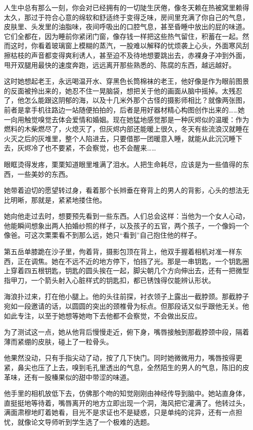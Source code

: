 \documentclass[lang=cn,newtx,12pt,scheme=chinese]{elegantbook}
\begin{document}
人生中总有那么一刻，你会对已经拥有的一切陡生厌倦，像冬天赖在热被窝里赖得太久，那过于符合心意的绵软和舒适终于变得乏味，房间里充满了你自己的气息，皮肤里、头发里的油脂味，夜间呼吸出的口腔气息，甚至昏睡中放出的屁的味道。它们全都在，因为睡前你紧闭门窗，像存钱一样把这些热气留住，积蓄在一起。然而这时，你看着玻璃窗上模糊的蒸汽，一股难以解释的忧烦袭上心头，外面寒风刮擦枯枝的声音都变得爽利诱人，甚至迫不及待地想要跳出去，赤裸身子冲到外面，甩开双腿用最快的速度奔跑，远远离开那些熟悉的、陈腐的东西，越远越好。

这时她想起老王，永远喝温开水、穿黑色长筒棉袜的老王，他好像是作为眼前图景的反面被拎出来的，她忍不住一晃脑袋，想把关于他的画面从脑中摇掉。太残忍了，他怎么能跟这阴郁的海，以及十几米外那个古怪的摄影师相比？就像两张图，前者是拿手机往路边一站随便拍拍的，后者是用好器材精心构图创作出来的……她一向用触觉嗅觉去体会爱情和婚姻。现在她猛地感觉那是一种灰烬似的温暖：作为燃料的木柴燃尽了，火熄灭了，但灰烬内部还能暖上很久，冬天有些流浪汉就睡在火灭之后的灰堆里，整个人陷进去，只要借那一团暖意入睡，就能从此沉沉睡下去，灰烬冷了也不要紧，不会察觉，也不会醒来……

眼眶烫得发疼，栗栗知道眼里堆满了泪水。人把生命耗尽，应该是为一些值得的东西，一些美妙的东西。

她带着迫切的愿望转过身，看着那个长辫垂在脊背上的男人的背影，心头的想法无比明晰，那就是，紧紧地搂住他。

她向他走过去时，想要预先看到一些东西。人们总会这样：当他为一个女人心动，他能瞬间想象出两人拍婚纱照的样子，以及孩子的五官，两个孩子，一个像妈一个像爸。可这次栗栗看不到那么远，她只“看到”自己抱住他的样子。

第五岳单膝跪在沙子里，佝着背，摄影包顶在背上，他双手握着相机对准一样东西，正在调焦。她在不远不近的地方停下，怕挡了光。那是一串钥匙，一个钥匙圈上穿着四五根钥匙，钥匙的圆头挨在一起，脚尖朝几个方向伸出去，还有一把微型指甲刀，一个箭头射入心脏样式的钥匙扣，都已锈蚀得仅能辨认形状。

海浪扑过来，打在他小腿上。他的头往前探，衬衣领子上露出一截脖颈。那截脖子宛如一段邀请的话，以圆圆的突出的颈椎骨为标点。但那段话又似乎跟他无关。他如此专注，以至于她想等她吻下去他都不会察觉，不会做出反应。

为了测试这一点，她从他背后慢慢走近，俯下身，嘴唇接触到那截脖颈中段，隔着薄而紧绷的皮肤，碰上了一粒骨头。

他果然没动，只有手指尖动了动，按了几下快门。同时她微微用力，嘴唇按得更紧，鼻尖也压了上去，嗅到毛孔里透出的气息，全然陌生的男人的气息，陈旧的皮革味，还有一股榛果似的甜中带涩的味道。

他手里的相机放低下去，仿佛那个吻的知觉刚刚由神经传导到脑中。她站直身体，直挺挺地等待着，嘴唇离开的地方立即出现一个洞，海风把它灌满了。他转过头，满面肃穆地盯着她看，目光不是求证也不是疑惑，只是单纯的诧异，还有一点担忧，就像论文导师听到学生选了一个极难的选题。
\end{document}

